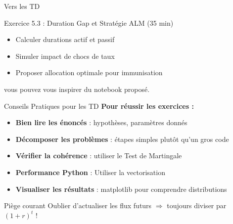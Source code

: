 \documentclass[10pt,aspectratio=169]{beamer}
\begin{document}
\begin{frame}{Vers les TD}
\begin{block}{Exercice 5.3 : Duration Gap et Stratégie ALM (35 min)}
\begin{itemize}
    \item Calculer durations actif et passif
    \item Simuler impact de chocs de taux
    \item Proposer allocation optimale pour immunisation
\end{itemize}
\end{block}


\vspace{0.5cm}
vous pouvez vous inspirer du notebook proposé.
\end{frame}

\begin{frame}{Conseils Pratiques pour les TD}
\textbf{Pour réussir les exercices :}

\begin{itemize}
    \item \textbf{Bien lire les énoncés} : hypothèses, paramètres donnés
    \item \textbf{Décomposer les problèmes} : étapes simples plutôt qu'un gros code
    \item \textbf{Vérifier la cohérence} : utiliser le Test de Martingale
    \item \textbf{Performance Python} : Utiliser la vectorisation
    \item \textbf{Visualiser les résultats} : matplotlib pour comprendre distributions
\end{itemize}

\vspace{0.3cm}
\begin{alertblock}{Piège courant}
Oublier d'actualiser les flux futurs $\Rightarrow$ toujours diviser par $(1+r)^t$ !
\end{alertblock}

\vspace{0.3cm}
\end{frame}
\end{document}
